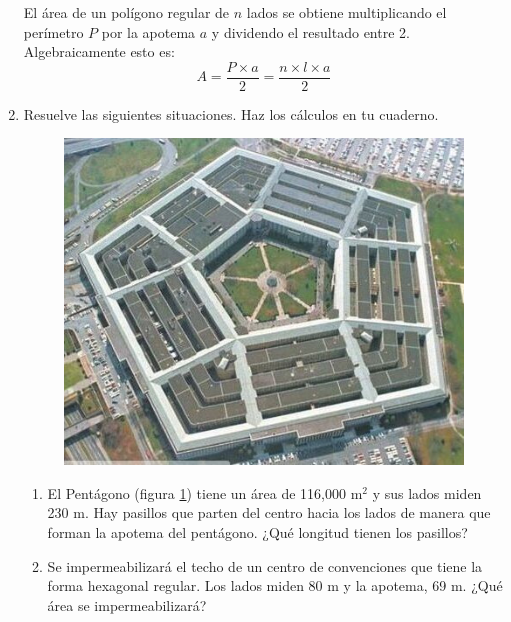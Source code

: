 \documentclass[11pt]{book}
\begin{document}
\begin{enumerate}
        \begin{boxH}
          El área de un polígono regular de $n$ lados se obtiene multiplicando el perímetro $P$ por la apotema $a$ y dividendo el resultado entre 2. Algebraicamente esto es:
          \[ A=\dfrac{P \times a}{2} = \dfrac{n \times l \times a}{2}\]
        \end{boxH}

  \item Resuelve las siguientes situaciones. Haz los cálculos en tu cuaderno.

        \begin{minipage}[t]{0.35\textwidth}
          \begin{figure}[H]
            \centering
            \includegraphics[width=\linewidth]{pentagono.jpg}
            \label{fig:pentagono}
          \end{figure}
        \end{minipage}\hfill
        \begin{minipage}[t]{0.55\textwidth}
          \begin{enumerate}
            \item El Pentágono (figura \ref{fig:pentagono}) tiene un área de 116,000 m$^2$ y sus lados miden 230 m. Hay pasillos que parten del centro hacia los lados de manera que forman la apotema del pentágono. ¿Qué longitud tienen los pasillos?
            \item Se impermeabilizará el techo de un centro de convenciones que tiene la forma hexagonal regular. Los lados miden 80 m y la apotema, 69 m. ¿Qué área se impermeabilizará?
          \end{enumerate}
        \end{minipage}
\end{enumerate}
\end{document}
